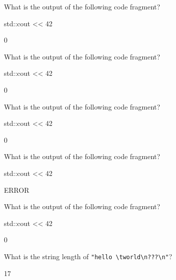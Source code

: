 \nextq
What is the output of the following code fragment?
\begin{console}[fontsize=\footnotesize]
std::cout << 42 %
\end{console}
\ANSWER
\begin{answercode}
0
\end{answercode}

\nextq
What is the output of the following code fragment?
\begin{console}[fontsize=\footnotesize]
std::cout << 42 %
\end{console}
\ANSWER
\begin{answercode}
0
\end{answercode}

\nextq
What is the output of the following code fragment?
\begin{console}[fontsize=\footnotesize]
std::cout << 42 %
\end{console}
\ANSWER
\begin{answercode}
0
\end{answercode}

\nextq
What is the output of the following code fragment?
\begin{console}[fontsize=\footnotesize]
std::cout << 42 %
\end{console}
\ANSWER
\begin{answercode}
ERROR
\end{answercode}

\nextq
What is the output of the following code fragment?
\begin{console}[fontsize=\footnotesize]
std::cout << 42 %
\end{console}
\ANSWER
\begin{answercode}
0
\end{answercode}

\nextq
What is the string length of \verb!"hello \tworld\n???\n"!?
\\
\ANSWER
\begin{answercode}
17
\end{answercode}

